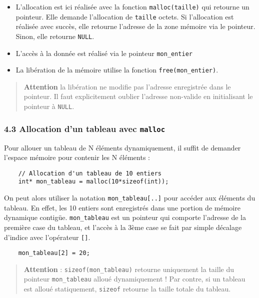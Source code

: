 \documentclass[11pt]{article}
\begin{document}
\begin{itemize}
\item
  L'allocation est ici réalisée avec la fonction \texttt{malloc(taille)}
  qui retourne un pointeur. Elle demande l'allocation de \texttt{taille}
  octets. Si l'allocation est réalisée avec succès, elle retourne
  l'adresse de la zone mémoire via le pointeur. Sinon, elle retourne
  \texttt{NULL}.
\item
  L'accès à la donnée est réalisé via le pointeur \texttt{mon\_entier}
\item
  La libération de la mémoire utilise la fonction
  \texttt{free(mon\_entier)}.
\end{itemize}

\begin{quote}
\textbf{Attention} la libération ne modifie pas l'adresse enregistrée
dans le pointeur. Il faut explicitement oublier l'adresse non-valide en
initialisant le pointeur à \texttt{NULL}.
\end{quote}

    \subsubsection{\texorpdfstring{4.3 Allocation d'un tableau avec
\texttt{malloc}}{4.3 Allocation d'un tableau avec malloc}}\label{allocation-dun-tableau-avec-malloc}

Pour allouer un tableau de N éléments dynamiquement, il suffit de
demander l'espace mémoire pour contenir les N éléments :

\begin{verbatim}
    // Allocation d'un tableau de 10 entiers
    int* mon_tableau = malloc(10*sizeof(int));
\end{verbatim}

On peut alors utiliser la notation \texttt{mon\_tableau{[}..{]}} pour
accéder aux éléments du tableau. En effet, les 10 entiers sont
enregistrés dans une portion de mémoire dynamique contigüe.
\texttt{mon\_tableau} est un pointeur qui comporte l'adresse de la
première case du tableau, et l'accès à la 3ème case se fait par simple
décalage d'indice avec l'opérateur \texttt{{[}{]}}.

\begin{verbatim}
    mon_tableau[2] = 20;
\end{verbatim}

\begin{quote}
\textbf{Attention} : \texttt{sizeof(mon\_tableau)} retourne uniquement
la taille du pointeur \texttt{mon\_tableau} alloué dynamiquement ! Par
contre, si un tableau est alloué statiquement, \texttt{sizeof} retourne
la taille totale du tableau.
\end{quote}
\end{document}
